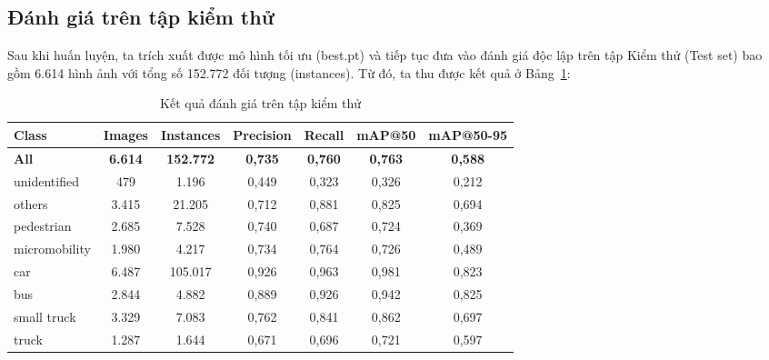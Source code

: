 \subsection{Đánh giá trên tập kiểm thử}

Sau khi huấn luyện, ta trích xuất được mô hình tối ưu (best.pt) và tiếp tục đưa vào đánh giá độc lập trên tập Kiểm thử (Test set) bao gồm 6.614 hình ảnh với tổng số 152.772 đối tượng (instances). Từ đó, ta thu được kết quả ở Bảng~\ref{metrics}:

\begin{table}[htbp]
	\centering
	\caption{Kết quả đánh giá trên tập kiểm thử}
	\label{metrics}
	\begin{tabular}{l c c c c c c}
		\toprule
		\textbf{Class} & \textbf{Images} & \textbf{Instances} & \textbf{Precision} & \textbf{Recall} & \textbf{mAP@50} & \textbf{mAP@50-95} \\
		\midrule
		\textbf{All} & \textbf{6.614} & \textbf{152.772} & \textbf{0,735} & \textbf{0,760} & \textbf{0,763} & \textbf{0,588} \\
		\midrule
		unidentified  & 479   & 1.196   & 0,449 & 0,323 & 0,326 & 0,212 \\
		others        & 3.415 & 21.205  & 0,712 & 0,881 & 0,825 & 0,694 \\
		pedestrian    & 2.685 & 7.528   & 0,740 & 0,687 & 0,724 & 0,369 \\
		micromobility & 1.980 & 4.217   & 0,734 & 0,764 & 0,726 & 0,489 \\
		car           & 6.487 & 105.017 & 0,926 & 0,963 & 0,981 & 0,823 \\
		bus           & 2.844 & 4.882   & 0,889 & 0,926 & 0,942 & 0,825 \\
		small truck   & 3.329 & 7.083   & 0,762 & 0,841 & 0,862 & 0,697 \\
		truck         & 1.287 & 1.644   & 0,671 & 0,696 & 0,721 & 0,597 \\
		\bottomrule
	\end{tabular}
\end{table}

